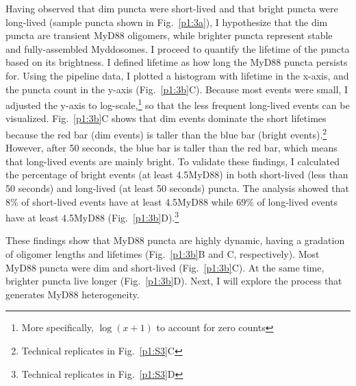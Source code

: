 Having observed that dim puncta were short-lived and that bright puncta were long-lived (sample puncta shown in Fig.~\ref{p1:3a}), I hypothesize that the dim puncta are transient MyD88 oligomers, while brighter puncta represent stable and fully-assembled Myddosomes. I proceed to quantify the lifetime of the puncta based on its brightness. I defined lifetime as how long the MyD88 puncta persists for. Using the pipeline data, I plotted a histogram with lifetime in the x-axis, and the puncta count in the y-axis (Fig.~\ref{p1:3b}C). Because most events were small, I adjusted the y-axis to log-scale,\footnote{More specifically, $\log(x+1)$ to account for zero counts} so that the less frequent long-lived events can be visualized. Fig.~\ref{p1:3b}C shows that dim events dominate the short lifetimes because the red bar (dim events) is taller than the blue bar (bright events).\footnote{Technical replicates in Fig.~\ref{p1:S3}C} However, after 50 seconds, the blue bar is taller than the red bar, which means that long-lived events are mainly bright. To validate these findings, I calculated the percentage of bright events (at least 4.5\times MyD88) in both short-lived (less than 50 seconds) and long-lived (at least 50 seconds) puncta. The analysis showed that 8\% of short-lived events have at least 4.5\times MyD88 while 69\% of long-lived events have at least 4.5\times MyD88 (Fig.~\ref{p1:3b}D).\footnote{Technical replicates in Fig.~\ref{p1:S3}D}

These findings show that MyD88 puncta are highly dynamic, having a gradation of oligomer lengths and lifetimes (Fig.~\ref{p1:3b}B and C, respectively). Most MyD88 puncta were dim and short-lived (Fig.~\ref{p1:3b}C). At the same time, brighter puncta live longer (Fig.~\ref{p1:3b}D). Next, I will explore the process that generates MyD88 heterogeneity.



